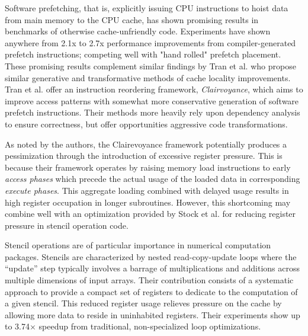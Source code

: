 \documentclass[nobib]{tufte-handout}
\begin{document}
Software prefetching, that is, explicitly issuing CPU instructions to hoist data from main memory to the CPU cache, has shown promising results in benchmarks of otherwise cache-unfriendly code.  Experiments have shown anywhere from 2.1x to 2.7x performance improvements from compiler-generated prefetch instructions; competing well with "hand rolled" prefetch placement\cite{Ainsworth}.  These promising results complement similar findings by Tran et al. who propose similar generative and transformative methods of cache locality improvements.  Tran et al. offer an instruction reordering framework, \emph{Clairvoyance}, which aims to improve access patterns with somewhat more conservative generation of software prefetch instructions\cite{Tran}.  Their methods more heavily rely upon dependency analysis to ensure correctness, but offer opportunities aggressive code transformations.

As noted by the authors, the Clairevoyance framework potentially produces a pessimization through the introduction of excessive register pressure\cite{Tran}.  This is because their framework operates by raising memory load instructions to early \emph{access phases} which precede the actual usage of the loaded data in corresponding \emph{execute phases}.  This aggregate loading combined with delayed usage results in high register occupation in longer subroutines.  However, this shortcoming may combine well with an optimization provided by Stock et al. for reducing register pressure in stencil operation code.  

Stencil operations are of particular importance in numerical computation packages.  Stencils are characterized by nested read-copy-update loops where the ``update'' step typically involves a barrage of multiplications and additions across multiple dimensions of input arrays.  Their contribution consists of a systematic approach to provide a compact set of registers to dedicate to the computation of a given stencil.  This reduced register usage relieves pressure on the cache by allowing more data to reside in uninhabited registers.  Their experiments show up to 3.74$\times$ speedup from traditional, non-specialized loop optimizations\cite{Stock}.  
\end{document}

